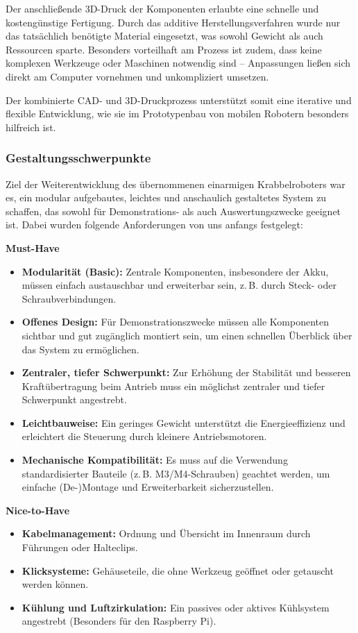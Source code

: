 Der anschließende 3D-Druck der Komponenten erlaubte eine schnelle und kostengünstige Fertigung. Durch das additive Herstellungsverfahren wurde nur das tatsächlich benötigte Material eingesetzt, was sowohl Gewicht als auch Ressourcen sparte. Besonders vorteilhaft am Prozess ist zudem, dass keine komplexen Werkzeuge oder Maschinen notwendig sind – Anpassungen ließen sich direkt am Computer vornehmen und unkompliziert umsetzen.

Der kombinierte CAD- und 3D-Druckprozess unterstützt somit eine iterative und flexible Entwicklung, wie sie im Prototypenbau von mobilen Robotern besonders hilfreich ist.

\subsubsection{Gestaltungsschwerpunkte}

Ziel der Weiterentwicklung des übernommenen einarmigen Krabbelroboters war es, ein modular aufgebautes, leichtes und anschaulich gestaltetes System zu schaffen, das sowohl für Demonstrations- als auch Auswertungszwecke geeignet ist. Dabei wurden folgende Anforderungen von uns anfangs festgelegt:

\textbf{Must-Have}
\begin{itemize}
  \item \textbf{Modularität (Basic):} Zentrale Komponenten, insbesondere der Akku, müssen einfach austauschbar und erweiterbar sein, z.\,B. durch Steck- oder Schraubverbindungen.
  \item \textbf{Offenes Design:} Für Demonstrationszwecke müssen alle Komponenten sichtbar und gut zugänglich montiert sein, um einen schnellen Überblick über das System zu ermöglichen.
  \item \textbf{Zentraler, tiefer Schwerpunkt:} Zur Erhöhung der Stabilität und besseren Kraftübertragung beim Antrieb muss ein möglichst zentraler und tiefer Schwerpunkt angestrebt.
  \item \textbf{Leichtbauweise:} Ein geringes Gewicht unterstützt die Energieeffizienz und erleichtert die Steuerung durch kleinere Antriebsmotoren.
  \item \textbf{Mechanische Kompatibilität:} Es muss auf die Verwendung standardisierter Bauteile (z.\,B. M3/M4-Schrauben) geachtet werden, um einfache (De-)Montage und Erweiterbarkeit sicherzustellen.
\end{itemize}

\textbf{Nice-to-Have}
\begin{itemize}
  \item \textbf{Kabelmanagement:} Ordnung und Übersicht im Innenraum durch Führungen oder Halteclips.
  \item \textbf{Klicksysteme:} Gehäuseteile, die ohne Werkzeug geöffnet oder getauscht werden können.
  \item \textbf{Kühlung und Luftzirkulation:} Ein passives oder aktives Kühlsystem angestrebt (Besonders für den Raspberry Pi).
\end{itemize}

